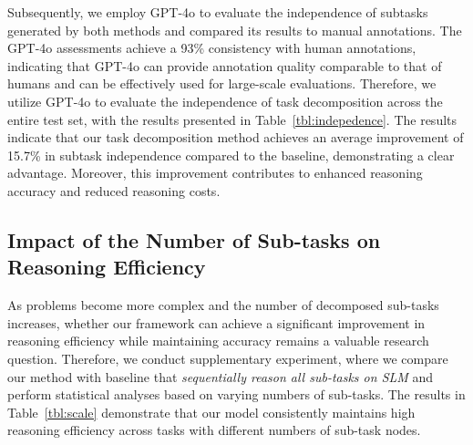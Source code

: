 

Subsequently, we employ GPT-4o to evaluate the independence of subtasks generated by both methods and compared its results to manual annotations. The GPT-4o assessments achieve a 93\% consistency with human annotations, indicating that GPT-4o can provide annotation quality comparable to that of humans and can be effectively used for large-scale evaluations. 
Therefore, we utilize GPT-4o to evaluate the independence of task decomposition across the entire test set, with the results presented in Table~\ref{tbl:indepedence}. The results indicate that our task decomposition method achieves an average improvement of 15.7\% in subtask independence compared to the baseline, demonstrating a clear advantage. Moreover, this improvement contributes to enhanced reasoning accuracy and reduced reasoning costs.




\vspace{-2mm}
\subsection{Impact of the Number of Sub-tasks on Reasoning Efficiency}


As problems become more complex and the number of decomposed sub-tasks increases, whether our framework can achieve a significant improvement in reasoning efficiency while maintaining accuracy remains a valuable research question.
Therefore, we conduct supplementary experiment, where we compare our method with baseline that \textit{sequentially reason all sub-tasks on SLM} and perform statistical analyses based on varying numbers of sub-tasks. The results in Table~\ref{tbl:scale} demonstrate that our model consistently maintains high reasoning efficiency across tasks with different numbers of sub-task nodes.

